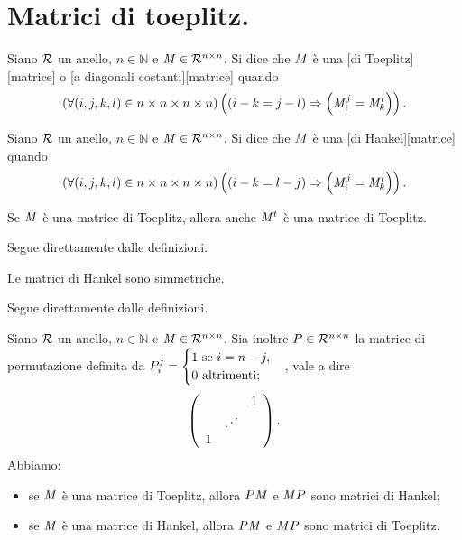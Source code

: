 \section{Matrici di toeplitz.}
\label{Matrici_MatriciDiToeplitz}
\begin{Definition}
	Siano $\mathcal{R}$ un anello, $n \in \mathbb{N}$ e $\mathit{M} \in \mathcal{R}^{n \times n}$. Si dice che $\mathit{M}$ \`e una [di Toeplitz][matrice] o [a diagonali costanti][matrice] quando
	\[
		\left ( \forall (i,j,k,l) \in n \times n \times n \times n \right ) \left ( \left ( i - k = j - l \right ) \Rightarrow \left ( \mathit{M}_i^j = \mathit{M}_k^l \right ) \right ).
	\]
\end{Definition}
\begin{Definition}
	Siano $\mathcal{R}$ un anello, $n \in \mathbb{N}$ e $\mathit{M} \in \mathcal{R}^{n \times n}$. Si dice che $\mathit{M}$ \`e una [di Hankel][matrice] quando
	\[
		\left ( \forall (i,j,k,l) \in n \times n \times n \times n \right ) \left ( \left ( i - k = l - j \right ) \Rightarrow \left ( \mathit{M}_i^j = \mathit{M}_k^l \right ) \right ).
	\]
\end{Definition}
\begin{Theorem}
	Se $\mathit{M}$ \`e una matrice di Toeplitz, allora anche ${\mathit{M}}^t$ \`e una matrice di Toeplitz.
\end{Theorem}
\Proof Segue direttamente dalle definizioni. \EndProof
\begin{Theorem}
	Le matrici di Hankel sono simmetriche.
\end{Theorem}
\Proof Segue direttamente dalle definizioni. \EndProof
\begin{Theorem}
	Siano $\mathcal{R}$ un anello, $n \in \mathbb{N}$ e $\mathit{M} \in \mathcal{R}^{n \times n}$. Sia inoltre $P \in \mathcal{R}^{n \times n}$ la matrice di permutazione definita da $P_i^j = \begin{cases}1\text{ se }i = n - j,\\0\text{ altrimenti};\end{cases}$, vale a dire
	\[
		\left (
		\begin{array}{ccc}
		& & 1\\
		& \iddots &\\
		1 & &
		\end{array}
		\right ).
	\]
	Abbiamo:
	\begin{itemize}
		\item se $\mathit{M}$ \`e una matrice di Toeplitz, allora $P \mathit{M}$ e $\mathit{M} P$ sono matrici di Hankel;
		\item se $\mathit{M}$ \`e una matrice di Hankel, allora $P \mathit{M}$ e $\mathit{M} P$ sono matrici di Toeplitz.
	\end{itemize}
\end{Theorem}
